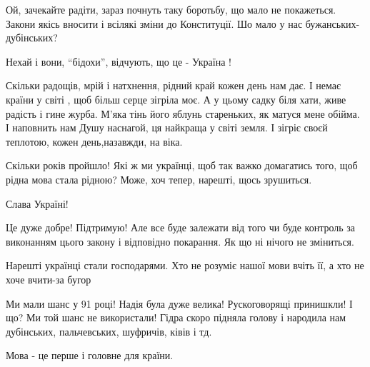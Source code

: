  
 
 
 
 
\zzSecCmt

\begin{itemize}

Ой, зачекайте радіти, зараз почнуть таку боротьбу, що мало не покажеться.
Закони якісь вносити і всілякі зміни до Конституції. Шо мало у
нас бужанських-дубінських?


Нехай і вони, \enquote{бідохи}, відчують, що це - Україна !


\obeycr
Скільки радощів, мрій і натхнення,
рідний край кожен день нам дає.
І немає країни у світі ,
щоб більш серце зігріла моє.
А у цьому садку біля хати,
живе радість і гине журба.
М'яка тінь його яблунь стареньких,
як матуся мене обійма.
І наповнить нам Душу наснагой,
ця найкраща у світі земля.
І зігріє своєй теплотою,
кожен день,назавжди, на віка.
\restorecr


Скільки років пройшло! Які ж ми українці, щоб так важко домагатись того, щоб
рідна мова стала рідною? Може, хоч тепер, нарешті, щось зрушиться.

Слава Україні!


Це дуже добре! Підтримую! Але все буде залежати від того чи буде контроль за
виконанням цього закону і відповідно покарання. Як що ні нічого
не зміниться.


Нарешті українці стали господарями. Хто не розуміє нашої мови вчіть її, а хто
не хоче вчити-за бугор


Ми мали шанс у 91 році! Надія була дуже велика! Рускоговорящі принишкли! І що?
Ми той шанс не використали! Гідра скоро підняла голову і
народила нам дубінських, пальчевських, шуфричів, ківів і тд.


Мова - це перше і головне для країни.


\end{itemize}
